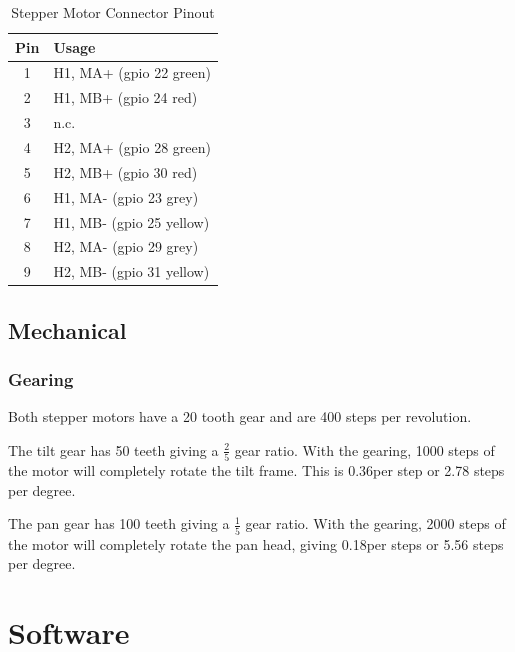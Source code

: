 \documentclass[10pt, openany]{book}
\begin{document}
\begin{table}
  \begin{center}
    \caption{Stepper Motor Connector Pinout}
    \label{tbl:Stepper}
    \begin{tabular}[htb]{|c|l|}
      \hline
      Pin & Usage \\
      \hline
      1 & H1, MA+ (gpio 22 green) \\
      2 & H1, MB+ (gpio 24 red) \\
      3 & n.c. \\
      4 & H2, MA+ (gpio 28 green) \\
      5 & H2, MB+ (gpio 30 red) \\
      6 & H1, MA- (gpio 23 grey) \\
      7 & H1, MB- (gpio 25 yellow) \\
      8 & H2, MA- (gpio 29 grey) \\
      9 & H2, MB- (gpio 31 yellow) \\
      \hline
    \end{tabular}
  \end{center}
\end{table}

\section{Mechanical}
\subsection{Gearing}
Both stepper motors have a 20 tooth gear and are 400 steps per revolution.

The tilt gear has 50 teeth giving a $\frac{2}{5}$ gear ratio.  With the gearing, 1000 steps of the motor will completely rotate the tilt frame.  This is 0.36\degree per step or 2.78 steps per degree.

The pan gear has 100 teeth giving a $\frac{1}{5}$ gear ratio.  With the gearing, 2000 steps of the motor will completely rotate the pan head, giving 0.18\degree per steps or 5.56 steps per degree.

\chapter{Software}
\end{document}
